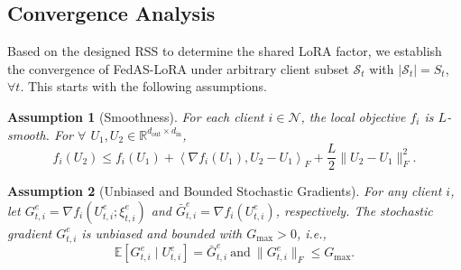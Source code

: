 \documentclass[lettersize,journal]{IEEEtran}
\newtheorem{assumption}{Assumption}
\begin{document}
\subsection{Convergence Analysis}
\label{subsec:convergence}
Based on the designed RSS to determine the shared LoRA factor, we establish the convergence of FedAS-LoRA under arbitrary client subset $\mathcal{S}_t$ with $|\mathcal{S}_t|=S_t$, $\forall t$. This starts with the following assumptions.
\begin{assumption}[Smoothness]
	\label{ass:smoothness}
	For each client $i \in \mathcal{N}$, the local objective $f_i$ is $L$-smooth. For $\forall$ $U_1,U_2\in\mathbb{R}^{d_{\mathrm{out}}\times d_{\mathrm{in}}}$,
	\begin{equation}
		f_i(U_2)
		\le
		f_i(U_1)
		+
		\left\langle
		\nabla f_i(U_1),
		U_2-U_1
		\right\rangle_F
		+
		\frac{L}{2}
		\|U_2-U_1\|_F^2 .
		\label{eq:smoothness_assumption}
	\end{equation}
\end{assumption}

\begin{assumption}[Unbiased and Bounded Stochastic Gradients]
	\label{ass:stochastic_gradient}
	For any client $i$, let $G_{t,i}^{e} = \nabla f_i(U_{t,i}^{e};\xi_{t,i}^{e})$ and $\bar{G}_{t,i}^{e} = \nabla f_i(U_{t,i}^{e})$, respectively. The stochastic gradient $G_{t,i}^{e}$ is unbiased and bounded with $G_{\max} > 0$, i.e.,
	\begin{equation}     \label{eq:unbiased and bounded}
		\mathbb{E}
		\left[
		G_{t,i}^{e}
		\mid
		U_{t,i}^{e}
		\right]
		= \bar{G}_{t,i}^{e} \ \mathrm{and} \ \|G_{t,i}^{e}\|_F \le G_{\max}.
	\end{equation}
	
	
	
\end{assumption}
\end{document}
